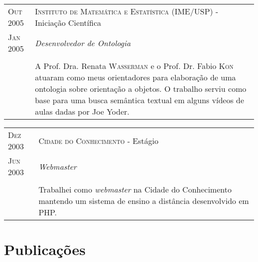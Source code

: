 \documentclass[letter,10pt]{article}
\begin{document}
\begin{tabular}{p{2.5cm}|p{13.5cm}}
  \textsc{Out 2005} & \textsc{Instituto de Matemática e Estatística
    (IME/USP)} - Iniciação Científica\\
  \textsc{Jan 2005}& \emph{Desenvolvedor de Ontologia}\\
  &\\
  & A Prof. Dra. Renata \textsc{Wasserman} e o Prof. Dr. Fabio
  \textsc{Kon} atuaram como meus orientadores para elaboração de uma
  ontologia sobre orientação a objetos. O trabalho serviu como base
  para uma busca semântica textual em alguns vídeos de aulas dadas por
  Joe Yoder.
\end{tabular}

\begin{tabular}{p{2.5cm}|p{13.5cm}}
  \textsc{Dez 2003} & \textsc{Cidade do Conhecimento} - Estágio\\
  \textsc{Jun 2003}& \emph{Webmaster}\\
  &\\
  & Trabalhei como \textit{webmaster} na Cidade do Conhecimento
  mantendo um sistema de ensino a distância desenvolvido em PHP.
\end{tabular}

\section{Publicações}
\end{document}
